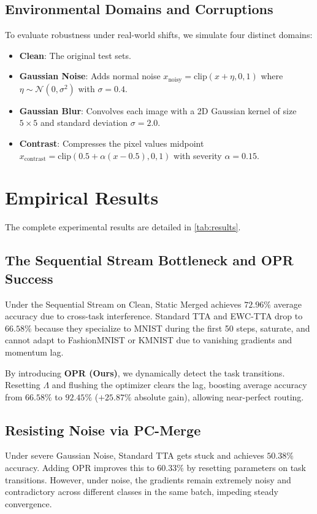 \documentclass{article}
\theoremstyle{plain}
\theoremstyle{definition}
\theoremstyle{remark}
\begin{document}
\subsection{Environmental Domains and Corruptions}
To evaluate robustness under real-world shifts, we simulate four distinct domains:
\begin{itemize}
    \item \textbf{Clean}: The original test sets.
    \item \textbf{Gaussian Noise}: Adds normal noise $x_{\text{noisy}} = \text{clip}(x + \eta, 0, 1)$ where $\eta \sim \mathcal{N}(0, \sigma^2)$ with $\sigma = 0.4$.
    \item \textbf{Gaussian Blur}: Convolves each image with a 2D Gaussian kernel of size $5 \times 5$ and standard deviation $\sigma = 2.0$.
    \item \textbf{Contrast}: Compresses the pixel values midpoint $x_{\text{contrast}} = \text{clip}(0.5 + \alpha(x - 0.5), 0, 1)$ with severity $\alpha = 0.15$.
\end{itemize}

\section{Empirical Results}
\label{sec:results}
The complete experimental results are detailed in \cref{tab:results}.

\subsection{The Sequential Stream Bottleneck and OPR Success}
Under the Sequential Stream on Clean, Static Merged achieves $72.96\%$ average accuracy due to cross-task interference. Standard TTA and EWC-TTA drop to $66.58\%$ because they specialize to MNIST during the first 50 steps, saturate, and cannot adapt to FashionMNIST or KMNIST due to vanishing gradients and momentum lag.

By introducing \textbf{OPR (Ours)}, we dynamically detect the task transitions. Resetting $\Lambda$ and flushing the optimizer clears the lag, boosting average accuracy from $66.58\%$ to $\mathbf{92.45\%}$ ($+25.87\%$ absolute gain), allowing near-perfect routing.

\subsection{Resisting Noise via PC-Merge}
Under severe Gaussian Noise, Standard TTA gets stuck and achieves $50.38\%$ accuracy. Adding OPR improves this to $60.33\%$ by resetting parameters on task transitions. However, under noise, the gradients remain extremely noisy and contradictory across different classes in the same batch, impeding steady convergence.
\end{document}
